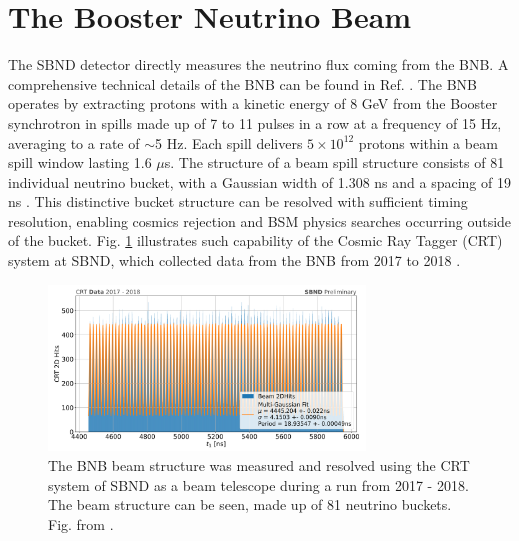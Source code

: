 \section{The Booster Neutrino Beam}
\label{sec4BNB}

The SBND detector directly measures the neutrino flux coming from the BNB. 
A comprehensive technical details of the BNB can be found in Ref. \cite{BNBMiniBooNE}.
The BNB operates by extracting protons with a kinetic energy of 8 GeV from the Booster synchrotron in spills made up of 7 to 11 pulses in a row at a frequency of 15 Hz, averaging to a rate of $\sim$5 Hz.
Each spill delivers $5 \times 10^{12}$ protons within a beam spill window lasting 1.6 $\mu$s.
The structure of a beam spill structure consists of 81 individual neutrino bucket, with a Gaussian width of 1.308 ns and a spacing of 19 ns \cite{BNBsigma}.
This distinctive bucket structure can be resolved with sufficient timing resolution, enabling cosmics rejection and BSM physics searches occurring outside of the bucket.
Fig. \ref{fig:CRT2017} illustrates such capability of the Cosmic Ray Tagger (CRT) system at SBND, which collected data from the BNB from 2017 to 2018 \cite{CPAD2022}.

\begin{figure}[htbp] 
\centering    
\includegraphics[width=0.75\textwidth]{CRT2017}
\caption[CRT2017]{
The BNB beam structure was measured and resolved using the CRT system of SBND as a beam telescope during a run from 2017 - 2018.
The beam structure can be seen, made up of 81 neutrino buckets.
Fig. from \cite{CPAD2022}.
}
\label{fig:CRT2017}
\end{figure}

